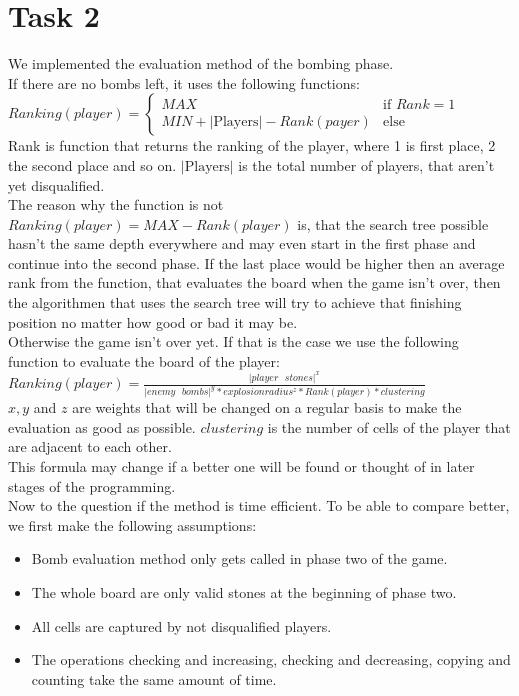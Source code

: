 \section{Task 2}

We implemented the evaluation method of the bombing phase. \\
If there are no bombs left, it uses the following functions: \\
$Ranking(player) = \begin{cases} 
				MAX & \mbox{if } Rank = 1 \\
				MIN + |\text{Players}| - Rank(payer) 	& \mbox{else}
		  \end{cases}$\\
Rank is function that returns the ranking of the player, where 1 is first place, 2 the second place and so on.  $|\text{Players}|$ is the total number of players, that aren't yet disqualified. \\
The reason why the function is not $Ranking(player) = MAX - Rank(player)$ is, that the search tree possible hasn't the same depth everywhere and may even start in the first phase and continue into the second phase. If the last place would be higher then an average rank from the function, that evaluates the board when the game isn't over, then the algorithmen that uses the search tree will try to achieve that finishing position no matter how good or bad it may be. \\

\noindent Otherwise the game isn't over yet. If that is the case we use the following function to evaluate the board of the player: \\
$ Ranking(player) = \frac{|player \text{ } stones|^x}{|enemy \text{ } bombs|^y * explosionradius^z * Rank(player) * clustering} $ \\
$x,y$ and $z$ are weights that will be changed on a regular basis to make the evaluation as good as possible. $clustering$ is the number of cells of the player that are adjacent to each other.\\
This formula may change if a better one will be found or thought of in later stages of the programming.\\

\noindent Now to the question if the method is time efficient. To be able to compare better, we first make the following assumptions:
\begin{itemize}
	\item Bomb evaluation method only gets called in phase two of the game.
	\item The whole board are only valid stones at the beginning of phase two.
	\item All cells are captured by not disqualified players.
	\item The operations checking and increasing, checking and decreasing, copying and counting take the same amount of time.
\end{itemize}

